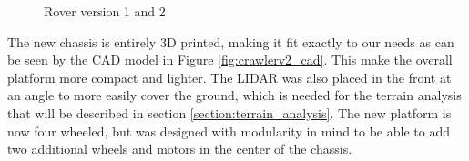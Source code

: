 \documentclass[12pt]{article}
\begin{document}
        \begin{figure}[H]
            \centering 
            \caption{Rover version 1 and 2}
            \label{fig:rover_comparison}
        \end{figure}

        The new chassis is entirely 3D printed, making it fit exactly to our needs as can be seen by the CAD model in Figure \ref{fig:crawlerv2_cad}. This make the overall platform more compact and lighter. The LIDAR was also placed in the front at an angle to more easily cover the ground, which is needed for the terrain analysis that will be described in section \ref{section:terrain_analysis}. The new platform is now four wheeled, but was designed with modularity in mind to be able to add two additional wheels and motors in the center of the chassis.
\end{document}

